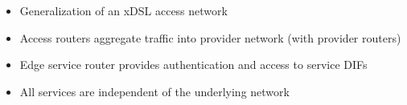 \begin{itemize}
    \item Generalization of an xDSL access network
    \item Access routers aggregate traffic into provider network (with provider routers)
    \item Edge service router provides authentication and access to service DIFs
    \item All services are independent of the underlying network
\end{itemize}
